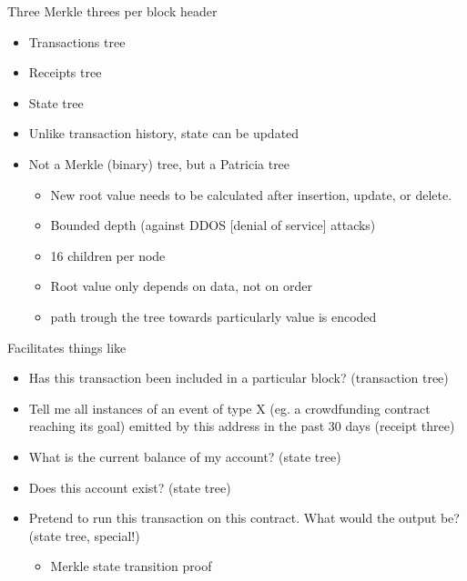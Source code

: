 \documentclass[presentation]{beamer}
\begin{document}
\begin{frame}[label=sec-5-4]{Three Merkle threes per block header}
\begin{itemize}
\item \alert{Transactions} tree
\item \alert{Receipts} tree
\item \alert{State} tree
\item Unlike transaction history, state can be \alert{updated}
\item Not a \alert{Merkle (binary) tree}, but a \alert{Patricia tree}
\begin{itemize}
\item New root value needs to be calculated after insertion, update, or delete.
\item \alert{Bounded depth} (against DDOS [denial of service] attacks)
\item \alert{16 children} per node
\item Root value only \alert{depends on data}, not on \alert{order}
\item \alert{path} trough the tree towards particularly value is encoded
\end{itemize}
\end{itemize}
\end{frame}

\begin{frame}[label=sec-5-5]{Facilitates things like}
\begin{itemize}
\item Has this transaction been included in a particular block? (\alert{transaction tree})
\item Tell me all instances of an event of type X (eg. a crowdfunding contract reaching its goal) emitted by this address in the past 30 days (\alert{receipt three})
\item What is the current balance of my account? (\alert{state tree})
\item Does this account exist? (\alert{state tree})
\item Pretend to run this transaction on this contract. What would the output be? (\alert{state tree, special!})
\begin{itemize}
\item \alert{Merkle state transition proof}
\end{itemize}
\end{itemize}
\end{frame}
\end{document}
